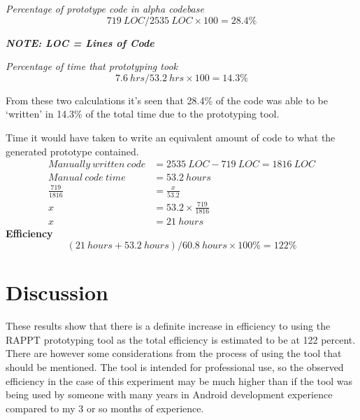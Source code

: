 \documentclass[11pt,english,numbers=endperiod,parskip=half,abstract=on]{scrreprt}
\begin{document}
  \centering
  \textit{Percentage of prototype code in alpha codebase}
  \[
    719\ LOC / 2535\ LOC \times 100 = 28.4\%
  \]

  \textbf{\textit{NOTE: LOC = Lines of Code}}

  \textit{Percentage of time that prototyping took}
  \[
    7.6\ hrs / 53.2\ hrs \times 100 = 14.3\%
  \]

  \raggedright
  From these two calculations it's seen that 28.4\% of the code was able to be
  `written' in 14.3\% of the total time due to the prototyping tool.

  Time it would have taken to write an equivalent amount of code to what
  the generated prototype contained.
  \begin{align}
    Manually\ written\ code &= 2535\ LOC - 719\ LOC = 1816\ LOC \\
    Manual\ code\ time &= 53.2\ hours \\
    \frac{719}{1816} &= \frac{x}{53.2} \\
    x &= 53.2 \times \frac{719}{1816} \\
    x &= 21\ hours
  \end{align}
  \centering
  \textbf{Efficiency}
  \[
    (21\ hours + 53.2\ hours) / 60.8\ hours \times 100\% = 122\%
  \]

\section{Discussion}
  These results show that there is a definite increase in efficiency to using
  the RAPPT prototyping tool as the total efficiency is estimated to be at 122
  percent. There are however some considerations from the process of using the
  tool that should be mentioned. The tool is intended for professional use, so
  the observed efficiency in the case of this experiment may be much higher than
  if the tool was being used by someone with many years in Android development
  experience compared to my 3 or so months of experience.
\end{document}
